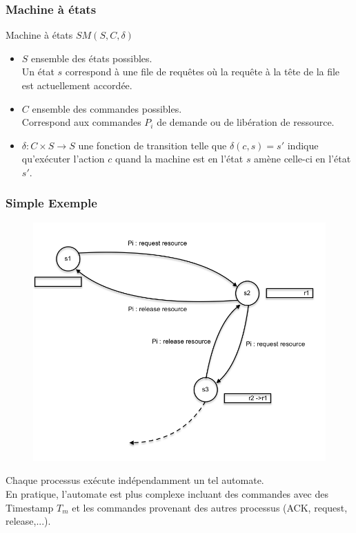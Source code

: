 \documentclass[compress]{beamer}
\begin{document}
\begin{frame}
\frametitle{Machine à états}
\begin{block}{Machine à états $SM(S, C, \delta)$}
\begin{itemize}
\item $S$ ensemble des états possibles. \\Un état $s$ correspond à une file de requêtes où la requête à la tête de la file est actuellement accordée.
\item $C$ ensemble des commandes possibles. \\Correspond aux commandes $P_i $ de demande ou de libération de ressource.
\item $\delta : C \times S \rightarrow S$ une fonction de transition telle que $\delta(c, s) = s'$ indique qu'exécuter l'action $c$ quand la machine est en l'état $s$ amène celle-ci en l'état $s'$.
\end{itemize}
\end{block}
\end{frame}

\begin{frame}
\frametitle{Simple Exemple}
\begin{figure}
	\includegraphics[scale=0.2]{state_machine.png}
\end{figure}
Chaque processus exécute indépendamment un tel automate. \\
En pratique, l'automate est plus complexe incluant des commandes avec des Timestamp $T_m$ et les commandes provenant des autres processus (ACK, request, release,...).
\end{frame}
\end{document}
